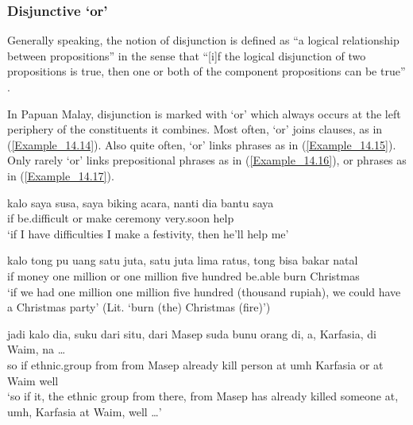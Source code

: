 \subsubsection[Disjunctive ato ‘or’]{Disjunctive  ‘or’}
\label{Para_14.2.2.1}
Generally speaking, the notion of disjunction is defined as “a logical relationship between propositions” in the sense that “[i]f the logical disjunction of two propositions is true, then one or both of the component propositions can be true” \citep[305]{Payne.1997}.

In Papuan Malay, disjunction is marked with  ‘or’ which always occurs at the left periphery of the constituents it combines. Most often,   ‘or’ joins clauses, as in (\ref{Example_14.14}). Also quite often,  ‘or’ links  phrases as in (\ref{Example_14.15}). Only rarely  ‘or’ links prepositional phrases as in (\ref{Example_14.16}), or  phrases as in (\ref{Example_14.17}).


\ea
\label{Example_14.14}
\gll  kalo  saya  susa,   saya  biking  acara,  nanti   dia  bantu  saya \\  
if   be.difficult  or   make  ceremony  very.soon    help  \\
\glt ‘if I have difficulties  I make a festivity, then he’ll help me’ \textstyleExampleSource{[080919-004-NP.0065]}
\z

\ea
\label{Example_14.15}
\gll  kalo  tong  pu  uang  satu  juta,    satu  juta  lima   ratus,  tong  bisa  bakar  natal\\  
if      money  one  million  or  one  million  five   hundred    be.able  burn  Christmas\\
\glt ‘if we had one million  one million five hundred (thousand rupiah), we could have a Christmas party’ (Lit. ‘burn (the) Christmas (fire)’) \textstyleExampleSource{[081006-017-Cv.0016]}
\z

\ea
\label{Example_14.16}
\gll       jadi  kalo  dia,  suku  dari  situ,  dari  Masep  suda   bunu  orang  di,  a,  Karfasia,    di  Waim,  na  {\ldots}\\  
so  if    ethnic.group  from    from  Masep  already   kill  person  at  umh  Karfasia  or  at  Waim  well \\
\glt ‘so if it, the ethnic group from there, from Masep has already killed someone at, umh, Karfasia  at Waim, well {\ldots}’ \textstyleExampleSource{[081006-027-CvEx.0002]}
\z

